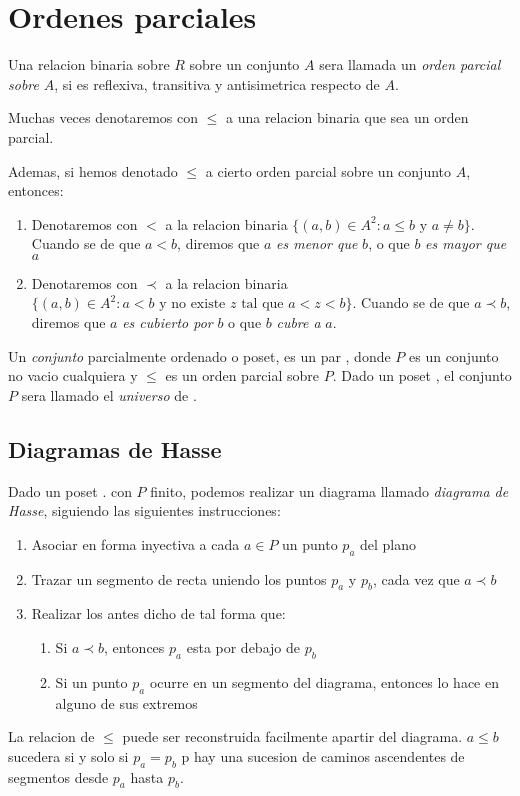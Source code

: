 

\section{Ordenes parciales}
\begin{definition}
  Una relacion binaria sobre $R$ sobre un conjunto $A$ sera llamada un \emph{orden parcial sobre} $A$,
  si es reflexiva, transitiva y antisimetrica respecto de $A$.
  
  Muchas veces denotaremos con $\leq$ a una relacion binaria que sea un orden parcial.

  Ademas, si hemos denotado $\leq$ a cierto orden parcial sobre un conjunto $A$, entonces:
  \begin{enumerate}
    \item Denotaremos con $<$ a la relacion binaria $\{(a, b) \in A^2 : a \leq b \text{ y } a \neq b\}$. Cuando se
    de que $a < b$, diremos que $a$ \emph{es menor que} $b$, o que $b$ \emph{es mayor que} $a$
    \item Denotaremos con $\prec$ a la relacion binaria $\{(a, b) \in A^2 : a < b \text{ y no existe $z$ tal que $a < z < b$}\}$.
    Cuando se de que $a \prec b$, diremos que $a$ \emph{es cubierto por} $b$ o que $b$ \emph{cubre a} $a$.
  \end{enumerate}
\end{definition}

\begin{definition}
  Un \emph{conjunto} parcialmente ordenado o poset, es un par \poset, donde $P$ es un conjunto no vacio
  cualquiera y $\leq$ es un orden parcial sobre $P$. Dado un poset \poset, el conjunto $P$ sera llamado el \emph{universo} de \poset.
\end{definition}

\subsection{Diagramas de Hasse}
Dado un poset \poset. con $P$ finito, podemos realizar un diagrama llamado \emph{diagrama de Hasse}, siguiendo las siguientes instrucciones:
\begin{enumerate}
  \item Asociar en forma inyectiva a cada $a \in P$ un punto $p_a$ del plano
  \item Trazar un segmento de recta uniendo los puntos $p_a$ y $p_b$, cada vez que $a \prec b$
  \item Realizar los antes dicho de tal forma que: \begin{enumerate}
    \item Si $a \prec b$, entonces $p_a$ esta por debajo de $p_b$
    \item Si un punto $p_a$ ocurre en un segmento del diagrama, entonces lo hace en alguno de sus extremos 
  \end{enumerate}
\end{enumerate}
La relacion de $\leq$ puede ser reconstruida facilmente apartir del diagrama. $a \leq b$ sucedera si y solo si
$p_a = p_b$ p hay una sucesion de caminos ascendentes de segmentos desde $p_a$ hasta $p_b$.

